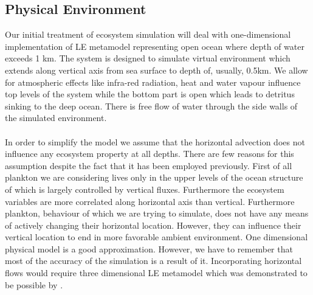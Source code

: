 \documentclass[12pt, a4paper]{report}
\begin{document}
\subsection{Physical Environment}\label{subsec:microsom}
Our initial treatment of ecosystem simulation will deal with one-dimensional implementation of LE metamodel
representing open ocean where depth of water exceeds 1 km. The system is designed to simulate virtual
environment which extends along vertical axis from sea surface to depth of, usually, 0.5km. We allow
for atmospheric effects like infra-red radiation, heat and water vapour influence top levels of the system
while the bottom part is open which leads to detritus sinking to the deep ocean. There is free flow
of water through the side walls of the simulated environment.
\\\\
In order to simplify the model we assume that the horizontal advection does not influence any
ecosystem property at all depths. There are few reasons for this assumption despite the fact that it has
been employed previously. First of all plankton we are considering lives only in the upper levels of the
ocean structure of which is largely controlled by vertical fluxes. Furthermore the ecosystem variables
are more correlated along horizontal axis than vertical. Furthermore plankton, behaviour of which we are
trying to simulate, does not have any means of actively changing their horizontal location. However, they
can influence their vertical location to end in more favorable ambient environment. One dimensional
physical model is a good approximation. However, we have to remember that most of the accuracy of the simulation
is a result of it. Incorporating horizontal flows would require three dimensional LE metamodel which was
demonstrated to be possible by \cite{VEW3D}.
\end{document}
